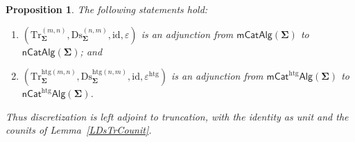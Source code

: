 \documentclass[a4paper, reqno]{amsbook}
\newcommand{\sig}[1]{\mathbf{#1}}             %
\newcommand{\htg}{\mathrm{htg}}                %
\newcommand{\id}{\mathrm{id}}
\newcommand{\Ds}{\mathrm{Ds}}
\newcommand{\Tr}{\mathrm{Tr}}
\theoremstyle{plain}
\newtheorem{proposition}[theorem]{Proposition}
\theoremstyle{definition}
\begin{document}
\begin{proposition}\label{PDsTrAdj}
The following statements hold:
\begin{enumerate}
\item $(\Tr^{(m,n)}_{\sig{\Sigma}},\Ds^{(n,m)}_{\sig{\Sigma}},\id,\varepsilon)$ is an adjunction from $\mathsf{mCatAlg}(\sig{\Sigma})$ to $\mathsf{nCatAlg}(\sig{\Sigma})$; and
\item $(\Tr^{\htg(m,n)}_{\sig{\Sigma}},\Ds^{\htg(n,m)}_{\sig{\Sigma}},\id,\varepsilon^{\htg})$ is an adjunction from $\mathsf{mCat}^{\htg}\mathsf{Alg}(\sig{\Sigma})$ to $\mathsf{nCat}^{\htg}\mathsf{Alg}(\sig{\Sigma})$.
\end{enumerate}
Thus discretization is left adjoint to truncation, with the identity as unit and the counits of Lemma~\ref{LDsTrCounit}.
\end{proposition}
\end{document}
